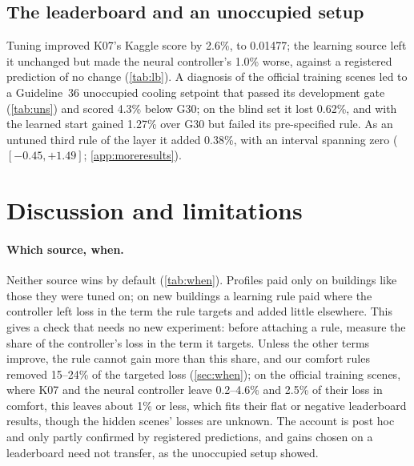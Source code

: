 \documentclass{article}
\begin{document}
\subsection{The leaderboard and an unoccupied setup}\label{sec:lb}

Tuning improved K07's Kaggle score by 2.6\%, to 0.01477; the learning source left it unchanged but made the neural controller's
1.0\% worse, against a registered prediction of no change (\cref{tab:lb}). A diagnosis of the official training scenes led to a Guideline~36 unoccupied cooling
setpoint that passed its development gate (\cref{tab:uns}) and scored 4.3\% below G30; on the blind set it lost 0.62\%,
and with the learned start gained 1.27\% over G30 but failed its pre-specified rule. As an untuned
third rule of the layer it added 0.38\%, with an interval spanning zero ($[-0.45, +1.49]$; \cref{app:moreresults}).

\section{Discussion and limitations}\label{sec:discussion}
\paragraph{Which source, when.}
Neither source wins by default (\cref{tab:when}). Profiles paid only on buildings like those they were tuned
on; on new buildings a learning rule paid where the controller left loss in the term the rule targets and
added little elsewhere. This gives a check that needs no new experiment: before attaching a rule, measure the
share of the controller's loss in the term it targets. Unless the other terms improve, the rule cannot gain
more than this share, and our comfort rules removed 15--24\% of the targeted loss (\cref{sec:when}); on the
official training scenes, where K07 and the neural controller leave 0.2--4.6\% and 2.5\% of their loss in
comfort, this leaves about 1\% or less, which fits their flat or negative leaderboard results, though the
hidden scenes' losses are unknown. The account is post hoc and only partly confirmed by registered
predictions, and gains chosen on a leaderboard need not transfer, as the unoccupied setup showed.
\end{document}
